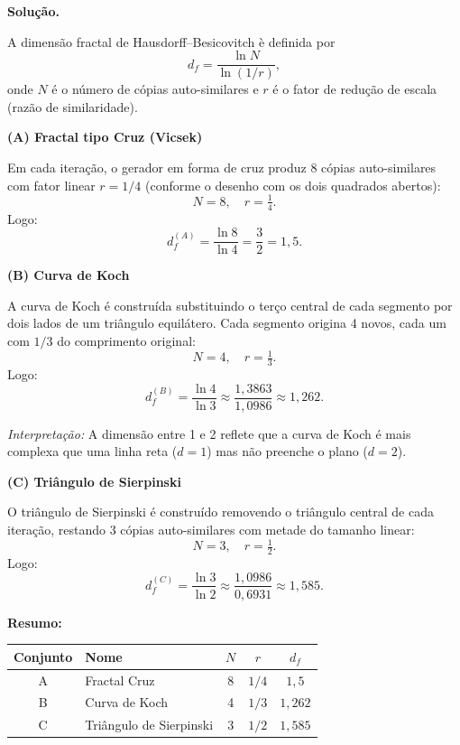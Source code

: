 \documentclass[12pt,a4paper]{article}
\theoremstyle{definition}
\newenvironment{solucao}{%
  \par\medskip\noindent\textbf{Solu\c{c}\~ao.}\quad\ignorespaces
}{%
  \par\medskip
}
\begin{document}
\begin{solucao}

A dimens\~ao fractal de Hausdorff--Besicovitch \`e definida por
\begin{equation}
  d_f = \frac{\ln N}{\ln(1/r)},
\end{equation}
onde $N$ \'e o n\'umero de c\'opias auto-similares e $r$ \'e o fator de redu\c{c}\~ao de escala (razão de similaridade).

\medskip
\noindent\textbf{(A) Fractal tipo Cruz (Vicsek)}

Em cada itera\c{c}\~ao, o gerador em forma de cruz produz $8$ c\'opias auto-similares com fator linear $r=1/4$ (conforme o desenho com os dois quadrados abertos):
\[
  N = 8, \quad r = \tfrac{1}{4}.
\]
Logo:
\begin{equation}
  \boxed{d_f^{(A)} = \frac{\ln 8}{\ln 4} = \frac{3}{2} = 1{,}5.}
\end{equation}

\medskip
\noindent\textbf{(B) Curva de Koch}

A curva de Koch \'e constru\'ida substituindo o ter\c{c}o central de cada segmento por dois lados de um tri\^angulo equil\'atero. Cada segmento origina 4 novos, cada um com $1/3$ do comprimento original:
\[
  N = 4, \quad r = \tfrac{1}{3}.
\]
Logo:
\begin{equation}
  \boxed{d_f^{(B)} = \frac{\ln 4}{\ln 3} \approx \frac{1{,}3863}{1{,}0986} \approx 1{,}262.}
\end{equation}

\noindent\textit{Interpreta\c{c}\~ao:} A dimens\~ao entre 1 e 2 reflete que a curva de Koch \'e mais complexa que uma linha reta ($d=1$) mas n\~ao preenche o plano ($d=2$).

\medskip
\noindent\textbf{(C) Tri\^angulo de Sierpinski}

O tri\^angulo de Sierpinski \'e constru\'ido removendo o tri\^angulo central de cada itera\c{c}\~ao, restando 3 c\'opias auto-similares com metade do tamanho linear:
\[
  N = 3, \quad r = \tfrac{1}{2}.
\]
Logo:
\begin{equation}
  \boxed{d_f^{(C)} = \frac{\ln 3}{\ln 2} \approx \frac{1{,}0986}{0{,}6931} \approx 1{,}585.}
\end{equation}

\medskip
\noindent\textbf{Resumo:}
\begin{center}
\begin{tabular}{clccc}
\hline
Conjunto & Nome & $N$ & $r$ & $d_f$ \\
\hline
A & Fractal Cruz & 8 & $1/4$ & $1{,}5$ \\
B & Curva de Koch         & 4 & $1/3$ & $1{,}262$ \\
C & Tri\^angulo de Sierpinski & 3 & $1/2$ & $1{,}585$ \\
\hline
\end{tabular}
\end{center}

\end{solucao}
\end{document}
